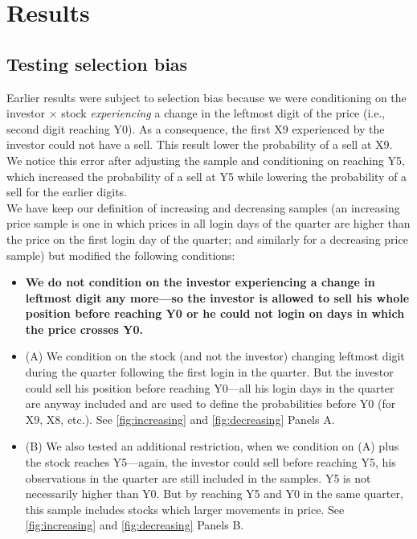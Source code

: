 \documentclass[
	USenglish,12pt,paper=a4,numbers=noenddot,abstract=on,
	final,%
	fullsample,
    ]{scrartcl}
\begin{document}
\section{Results}

\subsection{Testing selection bias}
Earlier results were subject to selection bias because we were conditioning on the investor $\times$ stock \textit{experiencing} a change in the leftmost digit of the price (i.e., second digit reaching Y0). As a consequence, the first X9 experienced by the investor could not have a sell. This result lower the probability of a sell at X9. We notice this error after adjusting the sample and conditioning on reaching Y5, which increased the probability of a sell at Y5 while lowering the probability of a sell for the earlier digits. \\
We have keep our definition of increasing and decreasing samples (an increasing price sample is one in which prices in all login days of the quarter are higher than the price on the first login day of the quarter; and similarly for a decreasing price sample) but modified the following conditions: 
\begin{itemize}
\item \textbf{We do not condition on the investor experiencing a change in leftmost digit any more---so the investor is allowed to sell his whole position before reaching Y0 or he could not login on days in which the price crosses Y0.}
\item (A) We condition on the stock (and not the investor) changing leftmost digit during the quarter following the first login in the quarter. But the investor could sell his position before reaching Y0---all his login days in the quarter are anyway included and are used to define the probabilities before Y0 (for X9, X8, etc.). See \ref{fig:increasing} and \ref{fig:decreasing} Panels A.
\item (B) We also tested an additional restriction, when we condition on (A) plus the stock reaches Y5---again, the investor could sell before reaching Y5, his observations in the quarter are still included in the samples. Y5 is not necessarily higher than Y0. But by reaching Y5 and Y0 in the same quarter, this sample includes stocks which larger movements in price. See \ref{fig:increasing} and \ref{fig:decreasing} Panels B.
\end{itemize}
\end{document}
